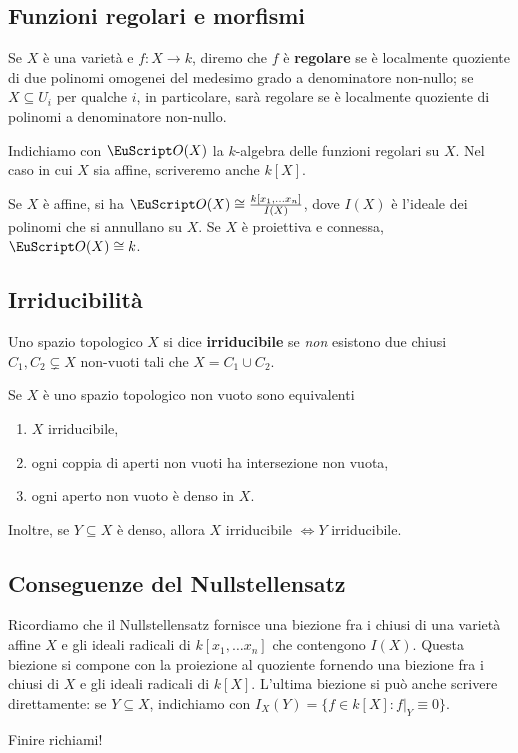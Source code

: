 \documentclass[twoside,openright,titlepage,numbers=noenddot,%
               headinclude,footinclude,cleardoublepage=empty,abstract=on,
               BCOR=23mm,paper=letter,fontsize=11pt
               ]{scrreprt}
\begin{document}
\subsection{Funzioni regolari e morfismi}
\begin{definition}
    Se $X$ è una varietà e $f: X \to k$, diremo che $f$ è \textbf{regolare} se è localmente quoziente di due polinomi omogenei del medesimo grado a denominatore non-nullo; se $X \subseteq U_i$ per qualche $i$, in particolare, sarà regolare se è localmente quoziente di polinomi a denominatore non-nullo.
\end{definition}
\begin{definition}
    Indichiamo con $\O(X)$ la $k$-algebra delle funzioni regolari su $X$. Nel caso in cui $X$ sia affine, scriveremo anche $k[X]$.
\end{definition}
\begin{remark}
    Se $X$ è affine, si ha $\O(X) \cong \frac{k[x_1, \dots x_n]}{I(X)}$, dove $I(X)$ è l'ideale dei polinomi che si annullano su $X$. Se $X$ è proiettiva e connessa, $\O(X) \cong k$.
\end{remark}
\subsection{Irriducibilità}
\begin{definition}
    Uno spazio topologico $X$ si dice \textbf{irriducibile} se \textit{non} esistono due chiusi $C_1, C_2 \subsetneq X$ non-vuoti tali che $X = C_1 \cup C_2$.
\end{definition}
\begin{exercise}
    Se $X$ è uno spazio topologico non vuoto sono equivalenti
    \begin{enumerate}
        \item $X$ irriducibile,
        \item ogni coppia di aperti non vuoti ha intersezione non vuota,
        \item ogni aperto non vuoto è denso in $X$.
    \end{enumerate}
    Inoltre, se $Y \subseteq X$ è denso, allora $X$ irriducibile $\iff Y$ irriducibile.
\end{exercise}
\subsection{Conseguenze del Nullstellensatz}
Ricordiamo che il Nullstellensatz fornisce una biezione fra i chiusi di una varietà affine $X$ e gli ideali radicali di $k[x_1, \dots x_n]$ che contengono $I(X)$. Questa biezione si compone con la proiezione al quoziente fornendo una biezione fra i chiusi di $X$ e gli ideali radicali di $k[X]$. L'ultima biezione si può anche scrivere direttamente: se $Y \subseteq X$, indichiamo con $I_{X}(Y) = \{f \in k[X]: f\vert_{Y} \equiv 0\}$.
\begin{center}
    Finire richiami!
\end{center}
\end{document}
